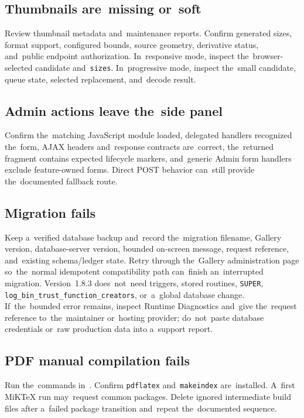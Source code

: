 \documentclass[11pt,a4paper]{article}
\newcommand{\version}{1.8.3}
\newcommand{\filepath}[1]{\path{#1}}
\newcommand{\codeword}[1]{\nolinkurl{#1}}
\begin{document}
\subsection{Thumbnails are~missing or~soft}

Review thumbnail metadata and~maintenance reports. Confirm generated sizes,
format support, configured bounds, source geometry, derivative status,
and~public endpoint authorization. In~responsive mode, inspect
the~browser-selected candidate and~\codeword{sizes}. In~progressive mode,
inspect the~small candidate, queue state, selected replacement, and~decode
result.

\subsection{Admin actions leave the~side panel}

Confirm the~matching JavaScript module loaded, delegated handlers recognized
the~form, AJAX headers and~response contracts are~correct, the~returned fragment
contains expected lifecycle markers, and~generic Admin form handlers exclude
feature-owned forms. Direct POST behavior can~still provide the~documented
fallback route.

\subsection{Migration fails}

Keep a~verified database backup and~record the~migration filename, Gallery
version, database-server version, bounded on-screen message, request reference,
and~existing schema/ledger state. Retry through the~Gallery administration page
so~the~normal idempotent compatibility path can~finish an~interrupted migration.
Version~\version{} does~not~need triggers, stored routines, \codeword{SUPER},
\codeword{log\_bin\_trust\_function\_creators}, or~a~global database change.
If~the~bounded error remains, inspect Runtime Diagnostics and~give the~request
reference to~the~maintainer or~hosting provider; do~not~paste database
credentials or~raw production data into a~support report.

\subsection{PDF manual compilation fails}

Run the~commands in~\filepath{docs/LATEX_BUILD.md}. Confirm \codeword{pdflatex}
and~\codeword{makeindex} are~installed. A~first MiKTeX run may~request common
packages. Delete ignored intermediate build files after a~failed package
transition and~repeat the~documented sequence.
\end{document}
